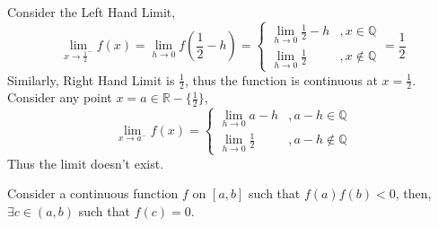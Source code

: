 	\begin{explanation}
		Consider the Left Hand Limit,
		\[\lim\limits_{x\to \frac{1}{2}^-}f(x)=\lim\limits_{h\to 0}f(\frac{1}{2}-h)=\begin{cases}
		\lim\limits_{h\to0}\frac{1}{2}-h &, x\in \mathbb{Q}\\
		\lim\limits_{h\to0}\frac{1}{2} &, x\notin \mathbb{Q}
		\end{cases}=\frac{1}{2}\]
		Similarly, Right Hand Limit is $\frac{1}{2}$, thus the function is continuous at $x=\frac{1}{2}$.\\
		Consider any point $x=a\in \mathbb{R}-\{\frac{1}{2}\}$,
		\[\lim\limits_{x\to a^-}f(x)=\begin{cases}
		\lim\limits_{h\to 0} a-h &, a-h\in \mathbb{Q}\\
		\lim\limits_{h\to 0} \frac{1}{2}&, a-h\notin \mathbb{Q}
		\end{cases}\]
		Thus the limit doesn't exist.
	\end{explanation}
	\begin{theorem}
		Consider a continuous function $f$ on $[a,b]$ such that $f(a)f(b)<0$, then, $\exists c\in (a,b)$ such that $f(c)=0$.
	\end{theorem}
